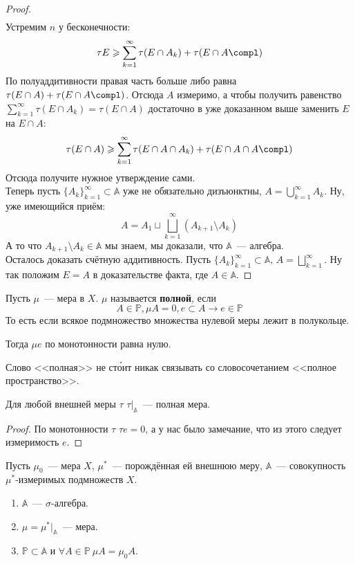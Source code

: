 \documentclass{article}
\begin{document}
\begin{proof}
\[\begin{split}
        \end{split}\]
        Устремим $n$ у бесконечности:
        $$
        \tau E\geqslant\sum\limits_{k=1}^\infty\tau(E\cap A_k)+\tau(E\cap A\compl)
        $$
        По полуаддитивности правая часть больше либо равна $\tau(E\cap A)+\tau(E\cap A\compl)$. Отсюда $A$ измеримо, а чтобы получить равенство $\sum\limits_{k=1}^\infty\tau(E\cap A_k)=\tau(E\cap A)$ достаточно в уже доказанном выше заменить $E$ на $E\cap A$:
        $$
        \tau(E\cap A)\geqslant\sum\limits_{k=1}^\infty\tau(E\cap A\cap A_k)+\tau(E\cap A\cap A\compl)
        $$
        Отсюда получите нужное утверждение сами.\\
        Теперь пусть $\{A_k\}_{k=1}^\infty\subset\mathbb A$ уже не обязательно дизъюнктны, $A=\bigcup\limits_{k=1}^\infty A_k$. Ну, уже имеющийся приём:
        $$
        A=A_1\sqcup\bigsqcup\limits_{k=1}^\infty(A_{k+1}\setminus A_k)
        $$
        А то что $A_{k+1}\setminus A_k\in\mathbb A$ мы знаем, мы доказали, что $\mathbb A$~--- алгебра.\\
        Осталось доказать счётную аддитивность. Пусть $\{A_k\}_{k=1}^\infty\subset\mathbb A$, $A=\bigsqcup\limits_{k=1}^\infty$. Ну так положим $E=A$ в доказательстве факта, где $A\in\mathbb A$. 
    \end{proof}
    \begin{definition}
        Пусть $\mu$~--- мера в $X$. $\mu$ называется \textbf{полной}, если
        $$A\in\mathbb P,\mu A=0,e\subset A\rightarrow e\in\mathbb P$$
        То есть если всякое подмножество множества нулевой меры лежит в полукольце.
    \end{definition}
    \begin{remark}
        Тогда $\mu e$ по монотонности равна нулю.
    \end{remark}
    \begin{remark}
        Слово <<полная>> не ст\'{о}ит никак связывать со словосочетанием <<полное пространство>>.
    \end{remark}
    \begin{corollary}
        Для любой внешней меры $\tau$ $\tau\big|_{\mathbb A}$~--- полная мера.
    \end{corollary}
    \begin{proof}
        По монотонности $\tau$ $\tau e=0$, а у нас было замечание, что из этого следует измеримость $e$.
    \end{proof}
    \begin{theorem}
        Пусть $\mu_0$~--- мера $X$, $\mu^*$~--- порождённая ей внешнюю меру, $\mathbb A$~--- совокупность $\mu^*$-измеримых подмножеств $X$.
        \begin{enumerate}
            \item $\mathbb A$~--- $\sigma$-алгебра.
            \item $\mu=\mu^*\big|_{\mathbb A}$~--- мера.
            \item $\mathbb P\subset\mathbb A$ и $\forall A\in\mathbb P~\mu A=\mu_0A$.
        \end{enumerate}
    \end{theorem}
\end{document}
